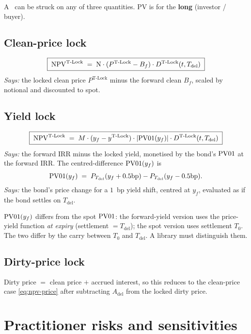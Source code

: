 \documentclass[11pt,a4paper]{article}
\newcommand{\Tlock}{\text{T-Lock}}
\newcommand{\Dtl}{D^{\Tlock}}
\newcommand{\Tdel}{T_{\mathrm{del}}}
\newcommand{\Adel}{A_{\mathrm{del}}}
\newcommand{\Ptl}{P^{\Tlock}}
\newcommand{\ytl}{y^{\Tlock}}
\newcommand{\Bf}{B_f}
\begin{document}
A \Tlock\ can be struck on any of three quantities. PV is for the
\textbf{long} (investor / buyer).

\subsection{Clean-price lock}
\begin{equation}\label{eq:npv-price}
\boxed{\;
\NPV^{\Tlock} \;=\; \mathrm{N} \cdot ( \Ptl - \Bf ) \cdot \Dtl(t,\Tdel)\;
}
\end{equation}
\textit{Says:} the locked clean price $\Ptl$ minus the forward clean
$\Bf$, scaled by notional and discounted to spot.

\subsection{Yield lock}
\begin{equation}\label{eq:npv-yield}
\boxed{\;
\NPV^{\Tlock} \;=\; M \cdot (y_f - \ytl) \cdot |\PVone(y_f)| \cdot \Dtl(t,\Tdel)\;
}
\end{equation}
\textit{Says:} the forward IRR minus the locked yield, monetised by
the bond's $\mathrm{PV01}$ at the forward IRR. The centred-difference
$\mathrm{PV01}(y_f)$ is
\begin{equation}\label{eq:pv01-fwd}
  \PVone(y_f) \;=\; \Bond{\Tdel}{y_f + 0.5\text{bp}} - \Bond{\Tdel}{y_f - 0.5\text{bp}}.
\end{equation}
\textit{Says:} the bond's price change for a $1$~bp yield shift,
centred at $y_f$, evaluated as if the bond settles on $\Tdel$.

\begin{remark}\label{rem:pv01-vs-fwd}
$\mathrm{PV01}(y_f)$ differs from the spot $\mathrm{PV01}$: the forward-yield
version uses the price-yield function \emph{at expiry} (settlement
$=\Tdel$); the spot version uses settlement $T_0$. The two differ by
the carry between $T_0$ and $\Tdel$. A library must distinguish them.
\end{remark}

\subsection{Dirty-price lock}
Dirty price $=$ clean price $+$ accrued interest, so this reduces
to the clean-price case \eqref{eq:npv-price} after subtracting
$\Adel$ from the locked dirty price.

\section{Practitioner risks and sensitivities}\label{sec:risks-practitioner}
\end{document}
